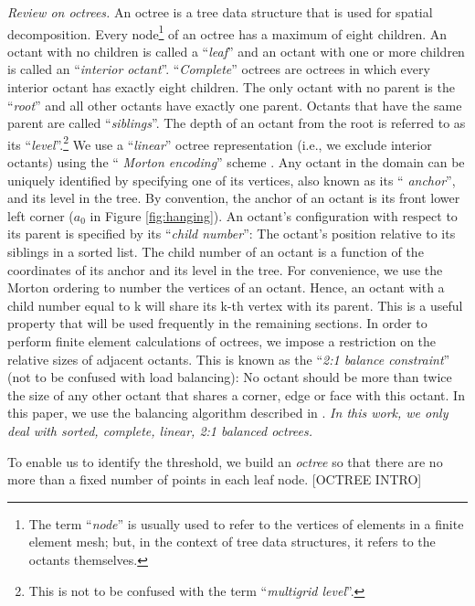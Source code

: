 {\em Review on octrees.} An octree is a tree data structure that is used for spatial decomposition. Every
node\footnote{The term ``{\em node}'' is usually used to refer to the
vertices of elements in a finite element mesh; but, in the context of
tree data structures, it refers to the octants themselves.} of an
octree has a maximum of eight children. An octant with no children is
called a ``{\em leaf}'' and an octant with one or more children is
called an ``{\em interior octant}''. ``{\em Complete}'' octrees are
octrees in which every interior octant has exactly eight children. The
only octant with no parent is the ``{\em root}'' and all other octants
have exactly one parent. Octants that have the same parent are called
``{\em siblings}''. The depth of an octant from the root is referred
to as its ``{\em level}''.\footnote{This is not to be confused with
the term ``{\em multigrid level}''.} We use a ``{\em linear}'' octree
representation (i.e., we exclude interior octants) using the ``{\em
Morton encoding}'' scheme \cite{bern99, zoltan, odaPaper07,
octPaper07, tropf81, tu05}. Any octant in the domain can be uniquely
identified by specifying one of its vertices, also known as its ``{\em
anchor}'', and its level in the tree. By convention, the anchor of an
octant is its front lower left corner ($a_0$ in Figure
\ref{fig:hanging}). An octant's configuration with respect to its
parent is specified by its ``{\em child number}'': The octant's
position relative to its siblings in a sorted list. The child number
of an octant is a function of the coordinates of its anchor and its
level in the tree. For convenience, we use the Morton ordering to
number the vertices of an octant. Hence, an octant with a child number
equal to k will share its k-th vertex with its parent. This is a
useful property that will be used frequently in the remaining
sections. In order to perform finite element calculations of octrees,
we impose a restriction on the relative sizes of adjacent
octants. This is known as the ``{\em 2:1 balance constraint}'' (not to
be confused with load balancing): No octant should be more than twice
the size of any other octant that shares a corner, edge or face with
this octant. In this paper, we use the balancing algorithm described
in \cite{octPaper07}. {\em In this work, we only deal with sorted,
complete, linear, 2:1 balanced octrees.}

  To enable us to identify the threshold, we build an {\em octree} so that there are no more than a fixed number of points in each leaf node. [OCTREE INTRO]

